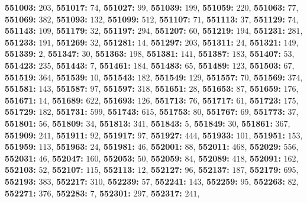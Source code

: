 \textsf{\bfseries 551003:} $203$, \textsf{\bfseries 551017:} $74$, \textsf{\bfseries 551027:} $99$, \textsf{\bfseries 551039:} $199$, \textsf{\bfseries 551059:} $220$, \textsf{\bfseries 551063:} $77$, \textsf{\bfseries 551069:} $382$, \textsf{\bfseries 551093:} $132$, \textsf{\bfseries 551099:} $512$, \textsf{\bfseries 551107:} $71$, \textsf{\bfseries 551113:} $37$, \textsf{\bfseries 551129:} $74$, \textsf{\bfseries 551143:} $109$, \textsf{\bfseries 551179:} $32$, \textsf{\bfseries 551197:} $294$, \textsf{\bfseries 551207:} $60$, \textsf{\bfseries 551219:} $194$, \textsf{\bfseries 551231:} $281$, \textsf{\bfseries 551233:} $191$, \textsf{\bfseries 551269:} $32$, \textsf{\bfseries 551281:} $14$, \textsf{\bfseries 551297:} $203$, \textsf{\bfseries 551311:} $24$, \textsf{\bfseries 551321:} $149$, \textsf{\bfseries 551339:} $2$, \textsf{\bfseries 551347:} $30$, \textsf{\bfseries 551363:} $198$, \textsf{\bfseries 551381:} $141$, \textsf{\bfseries 551387:} $183$, \textsf{\bfseries 551407:} $53$, \textsf{\bfseries 551423:} $235$, \textsf{\bfseries 551443:} $7$, \textsf{\bfseries 551461:} $184$, \textsf{\bfseries 551483:} $65$, \textsf{\bfseries 551489:} $123$, \textsf{\bfseries 551503:} $67$, \textsf{\bfseries 551519:} $364$, \textsf{\bfseries 551539:} $10$, \textsf{\bfseries 551543:} $182$, \textsf{\bfseries 551549:} $129$, \textsf{\bfseries 551557:} $70$, \textsf{\bfseries 551569:} $374$, \textsf{\bfseries 551581:} $143$, \textsf{\bfseries 551587:} $97$, \textsf{\bfseries 551597:} $318$, \textsf{\bfseries 551651:} $28$, \textsf{\bfseries 551653:} $87$, \textsf{\bfseries 551659:} $176$, \textsf{\bfseries 551671:} $14$, \textsf{\bfseries 551689:} $622$, \textsf{\bfseries 551693:} $126$, \textsf{\bfseries 551713:} $76$, \textsf{\bfseries 551717:} $61$, \textsf{\bfseries 551723:} $175$, \textsf{\bfseries 551729:} $182$, \textsf{\bfseries 551731:} $599$, \textsf{\bfseries 551743:} $615$, \textsf{\bfseries 551753:} $80$, \textsf{\bfseries 551767:} $69$, \textsf{\bfseries 551773:} $37$, \textsf{\bfseries 551801:} $56$, \textsf{\bfseries 551809:} $34$, \textsf{\bfseries 551813:} $341$, \textsf{\bfseries 551843:} $5$, \textsf{\bfseries 551849:} $30$, \textsf{\bfseries 551861:} $367$, \textsf{\bfseries 551909:} $241$, \textsf{\bfseries 551911:} $92$, \textsf{\bfseries 551917:} $97$, \textsf{\bfseries 551927:} $444$, \textsf{\bfseries 551933:} $101$, \textsf{\bfseries 551951:} $153$, \textsf{\bfseries 551959:} $113$, \textsf{\bfseries 551963:} $24$, \textsf{\bfseries 551981:} $46$, \textsf{\bfseries 552001:} $88$, \textsf{\bfseries 552011:} $468$, \textsf{\bfseries 552029:} $556$, \textsf{\bfseries 552031:} $46$, \textsf{\bfseries 552047:} $160$, \textsf{\bfseries 552053:} $50$, \textsf{\bfseries 552059:} $84$, \textsf{\bfseries 552089:} $418$, \textsf{\bfseries 552091:} $162$, \textsf{\bfseries 552103:} $52$, \textsf{\bfseries 552107:} $115$, \textsf{\bfseries 552113:} $12$, \textsf{\bfseries 552127:} $96$, \textsf{\bfseries 552137:} $187$, \textsf{\bfseries 552179:} $695$, \textsf{\bfseries 552193:} $383$, \textsf{\bfseries 552217:} $310$, \textsf{\bfseries 552239:} $57$, \textsf{\bfseries 552241:} $143$, \textsf{\bfseries 552259:} $95$, \textsf{\bfseries 552263:} $82$, \textsf{\bfseries 552271:} $376$, \textsf{\bfseries 552283:} $7$, \textsf{\bfseries 552301:} $297$, \textsf{\bfseries 552317:} $241$, 
